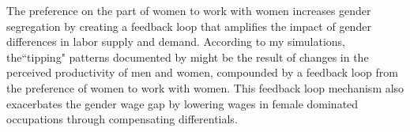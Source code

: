 \documentclass[12pt]{article}
\begin{document}


The preference on the part of women to work with women increases gender segregation by creating a feedback loop that amplifies the impact of gender differences in labor supply and demand. According to my simulations, the``tipping" patterns documented by  might be the result of changes in the perceived productivity of men and women, compounded by a feedback loop from the preference of women to work with women. This feedback loop mechanism also exacerbates the gender wage gap by lowering wages in female dominated occupations through compensating differentials.




\end{document}
